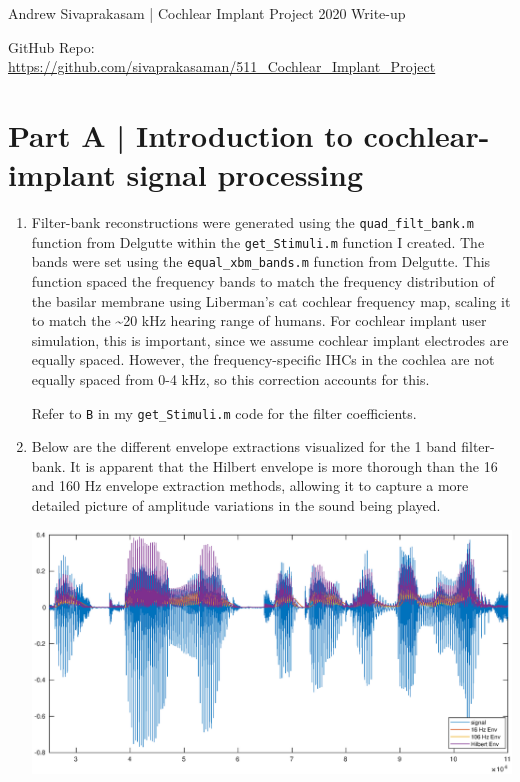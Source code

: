 \documentclass[9pt]{extarticle}
\begin{document}
{\huge Andrew Sivaprakasam | Cochlear Implant Project 2020 Write-up}
\begin{center}
GitHub Repo: \url{https://github.com/sivaprakasaman/511_Cochlear_Implant_Project}
\end{center}

\section{Part A | Introduction to cochlear-implant signal processing}

\begin{enumerate}[label = \alph*) ]
\item Filter-bank reconstructions were generated using the \verb|quad_filt_bank.m| function from Delgutte within the \verb|get_Stimuli.m| function I created. The bands were set using the \verb|equal_xbm_bands.m| function from Delgutte. This function spaced the frequency bands to match the frequency distribution of the basilar membrane using Liberman's cat cochlear frequency map, scaling it to match the \textasciitilde 20 kHz hearing range of humans. For cochlear implant user simulation, this is important, since we assume cochlear implant electrodes are equally spaced. However, the frequency-specific IHCs in the cochlea are not equally spaced from 0-4 kHz, so this correction accounts for this.  

\vspace{.5em}

Refer to \verb|B| in my \verb|get_Stimuli.m| code for the filter coefficients. 

\item Below are the different envelope extractions visualized for the 1 band filter-bank. It is apparent that the Hilbert envelope is more thorough than the 16 and 160 Hz envelope extraction methods, allowing it to capture a more detailed picture of amplitude variations in the sound being played. 

\begin{center}
\includegraphics[width = .85\textwidth]{envelopes}
\end{center}


\end{enumerate}
\end{document}
